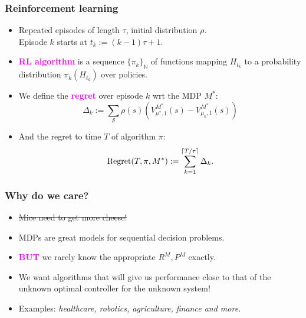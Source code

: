 \documentclass{beamer}
\newlength{\wideitemsep}
\let\olditem\item
\renewcommand{\item}{\setlength{\itemsep}{\wideitemsep}\olditem}
\newcommand{\Nat}{\mathbb{N}}
\newcommand{\Sc}{\mathcal{S}}
\newcommand{\bspace}{\vspace{3mm}}
\newcommand{\hilite}[1]{\textcolor{magenta}{\textbf{#1}}}
\begin{document}
\begin{frame}
\frametitle{Reinforcement learning}
\begin{itemize}
    \item Repeated episodes of length $\tau$, initial distribution $\rho$. \\
        Episode $k$ starts at $t_k := (k-1) \tau + 1$.
    \bspace
    \item \hilite{RL algorithm} is a sequence $\{\pi_k \}_\Nat$ of functions mapping $H_{t_k}$ to a probability distribution $\pi_{k}(H_{t_k})$ over policies.
    \bspace
    \item We define the \hilite{regret} over episode $k$ wrt the MDP $M^*$:
        $$\Delta_k := \sum_{\Sc} \rho(s) (V^{M^*}_{\mu^*, 1}(s) - V^{M^{*}}_{\mu_k, 1}(s))$$
    \item And the regret to time $T$ of algorithm $\pi$:
        $${\rm Regret}(T, \pi, M^*) := \sum_{k=1}^{\lceil T/\tau \rceil} \Delta_k.$$
\end{itemize}
\end{frame}

\begin{frame}
\frametitle{Why do we care?}
\begin{itemize}
    \item \st{Mice need to get more cheese!}
    \bspace
    \item MDPs are great models for sequential decision problems.
    \bspace
    \item \hilite{BUT} we rarely know the appropriate $R^M, P^M$ exactly.
    \bspace
    \item We want algorithms that will give us performance close to that of the unknown optimal controller for the unknown system!
    \bspace
    \pause
    \item Examples: \emph{healthcare, robotics, agriculture, finance and more.}
\end{itemize}
\end{frame}
\end{document}
